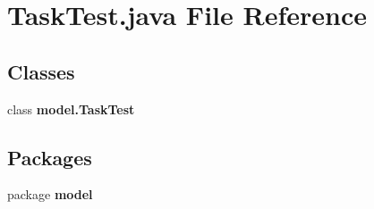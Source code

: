 \section{Task\+Test.\+java File Reference}
\label{_task_test_8java}
\subsection*{Classes}
\begin{DoxyCompactItemize}
\item 
class \textbf{ model.\+Task\+Test}
\end{DoxyCompactItemize}
\subsection*{Packages}
\begin{DoxyCompactItemize}
\item 
package \textbf{ model}
\end{DoxyCompactItemize}
